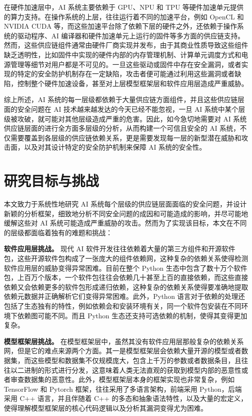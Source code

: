 在硬件加速层中，AI 系统主要依赖于 GPU、NPU 和 TPU 等硬件加速单元提供的算力支持。在操作系统的上层，往往运行着不同的加速平台，例如 OpenCL 和 NVIDIA CUDA 等，而这些加速平台除了依赖下层的硬件之外，还依赖于操作系统的驱动程序、AI 编译器和硬件加速单元上运行的固件等多方面的供应链支持。然而，这些供应链组件通常由硬件厂商实现并发布，由于其商业性质导致这些组件缺乏透明性，比如固件中实现的硬件内部的内存管理机制、计算单元调度方式和电源管理等细节对用户都是不可见的。一旦这些驱动或固件中存在安全漏洞，或者实现的特定的安全防护机制存在一定缺陷，攻击者便可能通过利用这些漏洞或者缺陷，控制整个硬件加速设备，甚至对上层模型框架层和软件应用层造成严重威胁。

综上所述，AI 系统的每一层级都依赖于大量供应链方面组件，并且这些供应链层面的安全问题在 AI 技术越来越发达的今天已经不能忽视，一旦 AI 系统中某个层级被攻破，就可能对其他层级造成严重的危害。因此，如今急切地需要对 AI 系统供应链层面的进行全方面多层级的分析，从而构建一个可信且安全的 AI 系统，不仅需要覆盖到各层级的供应链依赖关系，更是需要发现每一层的新型潜在威胁和攻击面，以及对其设计特定的安全防护机制来保障 AI 系统的安全性。

\section{研究目标与挑战}
本文致力于系统性地研究 AI 系统每个层级的供应链层面面临的安全问题，并设计新颖的分析框架，细致地分析不同安全问题的成因和可能造成的影响，并尽可能地缓解这些对 AI 系统可能造成严重威胁的攻击。然而为了实现该目标，本文在不同的层级都面临着独有的难题和挑战：

\textbf{软件应用层挑战。}
现代 AI 软件开发往往依赖着大量的第三方组件和开源软件包，这些开源软件包构成了一张庞大的组件依赖网，这种复杂的依赖关系使得检测软件应用层的威胁变得异常困难。目前在整个 Python 生态中包含了数十万个软件包，上百万个版本，一个软件包往往会依赖几十甚至上百的直接依赖，而这些直接依赖又会依赖更多的软件包形成递归依赖，这种复杂的依赖关系使得要准确地提取依赖元数据并正确解析它们变得异常困难。此外，Python 语言对于依赖的处理还包括了生态独有的特性，例如依赖会和安装环境有关，同一个软件包安装在不同环境下依赖图可能不同。而且 Python 生态还支持可选依赖的机制，使得其变得更加复杂。

\textbf{模型框架层挑战。}
在模型框架层中，虽然其没有软件应用层那般复杂的依赖关系网，但是它的难点来源两个方面。其一是模型框架层会依赖大量开源的模型或者数据集，而这些模型和数据集不仅规模庞大，包含上千万的参数或者数据条目，且往往以二进制的形式进行分发，这意味着人类无法直观的获取到模型内部的恶意性或者审查数据集的恶意性。此外，模型框架层本身的框架实现也非常复杂，例如 TensorFlow 和 Pytorch 框架，往往采用了多语言架构，前端采用 Python，后端采用 C++ 语言，并且伴随着 C++ 的多态和抽象语法特性，以及大量的宏定义，使得理解模型框架层的核心代码逻辑以及分析其漏洞变得尤为困难。


